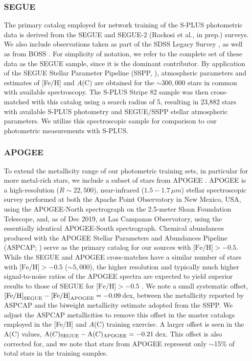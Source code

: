 \documentclass[twocolumn,trackchanges]{aastex63}
\begin{document}
\subsubsection{SEGUE}

The primary catalog employed for network training of the S-PLUS photometric data is derived from the SEGUE \citep{Yanny:2009} and SEGUE-2 (Rockosi et al., in prep.) surveys.  We also include observations taken as part of the SDSS Legacy Survey \citep{Abazajian:2009}, as well as from BOSS \citep{Dawson:2013}. For simplicity of notation, we refer to the complete set of these data as the SEGUE sample, since it is the dominant contributor. By application of the SEGUE Stellar Parameter Pipeline (SSPP, \citealt{Lee:2008a, Lee:2008b}), atmospheric parameters and estimates of [Fe/H] and $A$(C) are obtained for the $\sim 300,000$ stars in common with available spectroscopy. The S-PLUS Stripe 82 sample was then cross-matched with this catalog using a search radius of 5\arcsec, resulting in 23,882 stars with available S-PLUS photometry and SEGUE/SSPP stellar atmospheric parameters. We utilize this spectroscopic sample for comparison to our photometric measurements with S-PLUS. %

\subsubsection{APOGEE}

To extend the metallicity range of our photometric training sets, in particular for more metal-rich stars, we include a subset of stars from APOGEE \citep{Majewski:2017}. APOGEE is a high-resolution ($R \sim 22,500$), near-infrared ($1.5-1.7$\,$\mu m$) stellar spectroscopic survey performed at both the Apache Point Observatory in New Mexico, USA, using the APOGEE-North spectrograph on the 2.5-meter Sloan Foundation Telescope, and, as of Dec 2019, at Las Campanas Observatory, using the essentially identical APOGEE-South spectrograph. Chemical abundances produced with the APOGEE Stellar Parameters and Abundances Pipeline (ASPCAP; \citealt{ASPCAP}) serve as the primary catalog for our sources with $\textrm{[Fe/H]} > -0.5$. While the SEGUE  and APOGEE cross-matches have a similar number of stars with $\textrm{[Fe/H]}>-0.5$ ($\sim5,000$), the higher resolution and typically much higher signal-to-noise ratios of the APOGEE spectra are expected to yield superior results to those of SEGUE for $\textrm{[Fe/H]}>-0.5$ \citep{Meszaros:2013}. We note a small systematic offset, $\textrm{[Fe/H]}_{\rm SEGUE} - \textrm{[Fe/H]}_{\rm APOGEE} = -0.09$\,dex, between the metallicity reported by ASPCAP and the biweight metallicity estimate adopted from the SSPP. We adjust the ASPCAP metallicities to remove this offset in the master catalogs employed in the [Fe/H] and $A$(C) training exercise. A larger offset is seen in the A(C) values, $\textrm{A}(C)_{\rm SEGUE} - \textrm{A}(C)_{\rm APOGEE} = -0.21$\,dex. This offset is also corrected for, and we note that stars from APOGEE represent only $\sim$15\% of total stars in the training samples.
\end{document}
